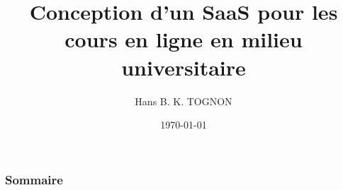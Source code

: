\documentclass{beamer}
\title{Conception d'un SaaS pour les cours en ligne en milieu universitaire}
\author{Hans B. K. TOGNON}
\institute{Institut de Recherche et de Formation en Informatique}
\date{\today}
\begin{document}
\begin{frame}
  \titlepage
  \end{frame}

\begin{frame}
  \frametitle{Sommaire}
  \tableofcontents
\end{frame}
\end{document}
